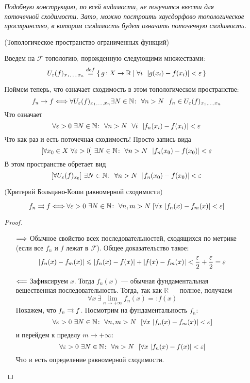 \textit{Подобную конструкцию, по всей видимости, не получится ввести для
поточечной сходимости. Зато, можно построить хаусдорфово топологическое
пространство, в котором сходимость будет означать поточечную сходимость.}
\begin{present}(Топологическое пространство ограниченных функций)

    Введем на $\mathcal{F}$ топологию, порожденную следующими множествами:
\[
    U_{\varepsilon}(f)_{x_1, \ldots, x_n} \overset{def}{\underset{}{=}}
    \{\, g \colon X \to \mathbb{R} \mid \forall i~~ |g(x_i) - f(x_i)| < \varepsilon \,\}
\]
    Поймем теперь, что означает сходимость в этом топологическом пространстве:
\[
        f_n \to f \Longleftrightarrow \forall U_{\varepsilon}(f)_{x_1, \ldots, x_n} \exists N \in
        \mathbb{N}\colon~ \forall n > N~~ f_n \in U_{\varepsilon}(f)_{x_1, \ldots, x_n}
\]
    Что означает
\[
    \forall \varepsilon > 0~ \exists N \in \mathbb{N}\colon~ \forall n > N~~ \forall i~~
    |f_n(x_i) - f(x_i)| < \varepsilon
\]
    Что как раз и есть поточечная сходимость! Просто запись вида
\[
    [\forall x_0 \in X~ \forall \varepsilon > 0]~ \exists N \in \mathbb{N}\colon~ \forall
    n > N~~ |f_n(x_0) - f(x_0)| < \varepsilon
\]
    В этом пространстве обретает вид
\[
    [\forall U_{\varepsilon}(f)_{x_0}]~ \exists N \in \mathbb{N}\colon~ \forall
    n > N~~ |f_n(x_0) - f(x_0)| < \varepsilon
\]
\end{present}

\begin{theorem}(Критерий Больцано-Коши равномерной сходимости)

\[
    f_n \rightrightarrows f \Longleftrightarrow \forall \varepsilon > 0~ \exists N \in \mathbb{N}\colon~
    \forall n, m > N~ [\forall x~ |f_n(x) - f_m(x)| < \varepsilon]
\]
\end{theorem}
\begin{proof}
    \enewline
    \begin{itemize}
        \item[$\Longrightarrow$] Обычное свойство всех последовательностей, сходящихся по
        метрике (если все $f_n$ и $f$ лежат в $\mathcal{F}$). Общее
        доказательство такое:
\[
            |f_n(x) - f_m(x)| \leqslant |f_n(x) - f(x)| + |f(x) - f_m(x)| <
            \frac{\varepsilon}{2} + \frac{\varepsilon}{2} = \varepsilon
\]

        \item[$\Longleftarrow$] Зафиксируем $x$. Тогда $f_n(x)$ --- обычная фундаментальная
        вещественная последовательность. Тогда, так как $\mathbb{R}$ --- полное,
        получаем
\[
        \forall x~ \exists \lim_{n \to +\infty}f_n(x) =: f(x)
\]
        Покажем, что $f_n \rightrightarrows f$. Посмотрим на фундаментальность $f_n$:
\[
        \forall \varepsilon > 0~ \exists N \in \mathbb{N}\colon~ \forall n, m > N~~
        [\forall x~ |f_n(x) - f_m(x)| < \varepsilon]
\]
        и перейдем к пределу $m \to +\infty$:
\[
        \forall \varepsilon > 0~ \exists N \in \mathbb{N}\colon~ \forall n > N~~
        [\forall x~ |f_n(x) - f(x)| < \varepsilon]
\]
        Что и есть определение равномерной сходимости.
    \end{itemize}
\end{proof}

